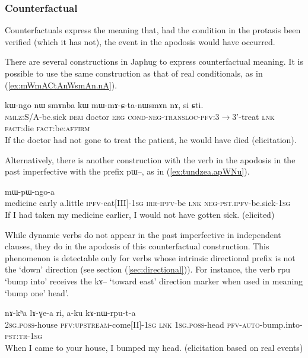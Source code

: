 \documentclass[oldfontcommands,oneside,a4paper,11pt]{article}
\newcommand{\ipa}[1]{{\phon \mbox{#1}}} %
\newcommand{\refb}[1]{(\ref{#1})}
\begin{document}
\subsubsection{Counterfactual} \label{sec:counterfact}
Counterfactuals express the meaning that, had the condition in the protasis been verified (which it has not), the event in the apodosis would have occurred.

There are several constructions in Japhug to express counterfactual meaning. It is possible to use the same construction as that of real conditionals, as    in \refb{ex:mWmACtAnWsmAn.nA}.
     \begin{exe}
   \ex \label{ex:mWmACtAnWsmAn.nA}
   \gll
\ipa{kɯ-ngo}  	\ipa{nɯ}  	\ipa{smɤnba}  	\ipa{kɯ}  	\ipa{mɯ-mɤ-ɕ-ta-nɯsmɤn}  	\ipa{nɤ,}  	\ipa{si}  	\ipa{ɕti.}  \\
\textsc{nmlz}:S/A-be.sick \textsc{dem} doctor \textsc{erg} \textsc{cond-neg-transloc-pfv}:3$\rightarrow$3'-treat \textsc{lnk} \textsc{fact}:die \textsc{fact}:be:\textsc{affirm} \\
\glt If the doctor had not gone to treat the patient, he would have died (elicitation).
\end{exe}

Alternatively, there is another construction with the verb in the apodosis in the past imperfective with the prefix \ipa{pɯ--}, as in \refb{ex:tundzea.apWNu}.

     \begin{exe}
   \ex \label{ex:tundzea.apWNu}
   \gll
[\ipa{smɤn}   	\ipa{ʑa} \ipa{tsa}   	\ipa{tu-ndze-a}   	\textbf{\ipa{a-pɯ-ŋu}}]   	\ipa{tɕe}   	\ipa{mɯ-pɯ-ngo-a}   \\
medicine early  a.little \textsc{ipfv}-eat[III]-\textsc{1sg} \textsc{irr-ipfv}-be \textsc{lnk} \textsc{neg-pst.ipfv}-be.sick-\textsc{1sg} \\
\glt If I had taken my medicine earlier, I would not have gotten sick. (elicited)
\end{exe}

While dynamic verbs do not appear in the past imperfective in independent clauses, they do in the apodosis of this counterfactual construction. This phenomenon is   detectable only for   verbs whose intrinsic directional prefix is not the `down' direction (see section \refb{sec:directional}). For instance, the verb \ipa{rpu} `bump into' receives the \ipa{kɤ}-- `toward east' direction marker when used in meaning `bump one' head'.

     \begin{exe}
   \ex \label{ex:kAnWrputa}
   \gll
\ipa{nɤ-kʰa}   	\ipa{lɤ-ɣe-a}   	\ipa{ri,}   	\ipa{a-ku}   	\ipa{kɤ-nɯ-rpu-t-a}   \\
\textsc{2sg.poss}-house \textsc{pfv:upstream}-come[II]-\textsc{1sg} \textsc{lnk} \textsc{1sg.poss}-head \textsc{pfv-auto}-bump.into-\textsc{pst:tr-1sg} \\
\glt  When I came to your house, I bumped my head. (elicitation based on real events)
\end{exe}
\end{document}
